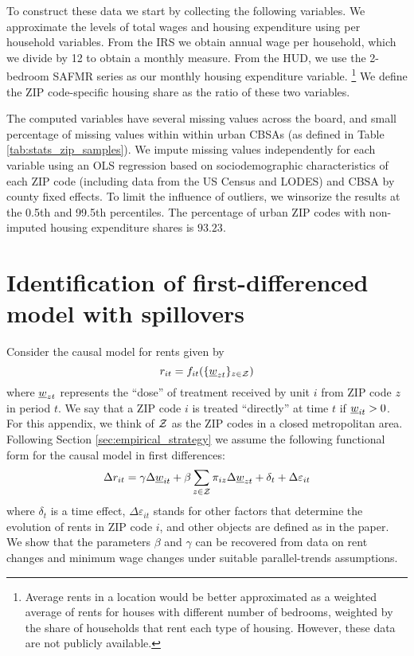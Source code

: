 To construct these data we start by collecting the following variables.
We approximate the levels of total wages and housing expenditure using per 
household variables.
From the IRS we obtain annual wage per household, which we 
divide by 12 to obtain a monthly measure.
From the HUD, we use the 2-bedroom SAFMR series as our monthly housing 
expenditure variable.%
\footnote{Average rents in a location would be better approximated as a
weighted average of rents for houses with different number of bedrooms,
weighted by the share of households that rent each type of housing.
However, these data are not publicly available.}
We define the ZIP code-specific housing share as the ratio of these two 
variables.

The computed variables have several missing values across the board, and 
small percentage of missing values within within urban CBSAs 
(as defined in Table \ref{tab:stats_zip_samples}).
We impute missing values independently for each variable using an OLS
regression based on sociodemographic characteristics of each ZIP code 
(including data from the US Census and LODES) and CBSA by county fixed effects.
To limit the influence of outliers, we winsorize the results at the 0.5th and 
99.5th percentiles. 
The percentage of urban ZIP codes with non-imputed housing expenditure shares 
is $93.23$.

\clearpage
\section{Identification of first-differenced model with spillovers}
\label{sec:did_spillovers_id}

Consider the causal model for rents given by
$$r_{it}=f_{it}(\{\underline{w}_{zt}\}_{z\in\mathcal{Z}})$$
where $\underline{w}_{zt}$ represents the ``dose'' of treatment received by unit $i$ from
ZIP code $z$ in period $t$.
We say that a ZIP code $i$ is treated ``directly'' at time $t$ if $\underline{w}_{it}>0$.
For this appendix, we think of $\mathcal{Z}$ as the ZIP codes in a closed metropolitan 
area. 
Following Section \ref{sec:empirical_strategy} we assume the following functional
form for the causal model in first differences:
\begin{equation}\label{eq:causal_model}
    \Delta r_{it} = \gamma \Delta \underline{w}_{it} 
                  + \beta \sum_{z\in\mathcal{Z}} \pi_{iz} \Delta \underline{w}_{zt}
                  + \delta_t + \Delta \varepsilon_{it}
\end{equation}
where $\delta_t$ is a time effect,
$\Delta \varepsilon_{it}$ stands for other factors that determine the evolution
of rents in ZIP code $i$, and
other objects are defined as in the paper.
We show that the parameters $\beta$ and $\gamma$ can be recovered from data on 
rent changes and minimum wage changes under suitable parallel-trends 
assumptions.

